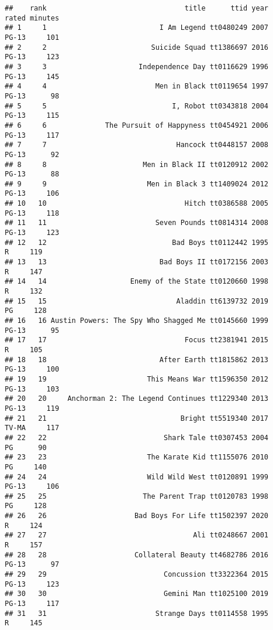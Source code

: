 \documentclass[
]{article}
\begin{document}
\begin{verbatim}
##    rank                                 title      ttid year     rated minutes
## 1     1                           I Am Legend tt0480249 2007     PG-13     101
## 2     2                         Suicide Squad tt1386697 2016     PG-13     123
## 3     3                      Independence Day tt0116629 1996     PG-13     145
## 4     4                          Men in Black tt0119654 1997     PG-13      98
## 5     5                              I, Robot tt0343818 2004     PG-13     115
## 6     6              The Pursuit of Happyness tt0454921 2006     PG-13     117
## 7     7                               Hancock tt0448157 2008     PG-13      92
## 8     8                       Men in Black II tt0120912 2002     PG-13      88
## 9     9                        Men in Black 3 tt1409024 2012     PG-13     106
## 10   10                                 Hitch tt0386588 2005     PG-13     118
## 11   11                          Seven Pounds tt0814314 2008     PG-13     123
## 12   12                              Bad Boys tt0112442 1995         R     119
## 13   13                           Bad Boys II tt0172156 2003         R     147
## 14   14                    Enemy of the State tt0120660 1998         R     132
## 15   15                               Aladdin tt6139732 2019        PG     128
## 16   16 Austin Powers: The Spy Who Shagged Me tt0145660 1999     PG-13      95
## 17   17                                 Focus tt2381941 2015         R     105
## 18   18                           After Earth tt1815862 2013     PG-13     100
## 19   19                        This Means War tt1596350 2012     PG-13     103
## 20   20     Anchorman 2: The Legend Continues tt1229340 2013     PG-13     119
## 21   21                                Bright tt5519340 2017     TV-MA     117
## 22   22                            Shark Tale tt0307453 2004        PG      90
## 23   23                        The Karate Kid tt1155076 2010        PG     140
## 24   24                        Wild Wild West tt0120891 1999     PG-13     106
## 25   25                       The Parent Trap tt0120783 1998        PG     128
## 26   26                     Bad Boys For Life tt1502397 2020         R     124
## 27   27                                   Ali tt0248667 2001         R     157
## 28   28                     Collateral Beauty tt4682786 2016     PG-13      97
## 29   29                            Concussion tt3322364 2015     PG-13     123
## 30   30                            Gemini Man tt1025100 2019     PG-13     117
## 31   31                          Strange Days tt0114558 1995         R     145

\end{verbatim}
\end{document}
